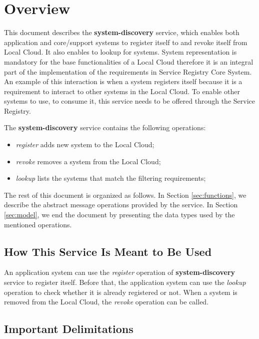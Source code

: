 \documentclass[a4paper]{arrowhead}
\begin{document}
\section{Overview}
\label{sec:overview}
This document describes the \textbf{system-discovery} service, which enables both application and core/support systems to register itself to and revoke itself from Local Cloud. It also enables to lookup for systems. System representation is mandatory for the base functionalities of a Local Cloud therefore it is an integral part of the implementation of the requirements in Service Registry Core System. An example of this interaction is when a system registers itself because it is a requirement to interact to other systems in the Local Cloud. To enable other systems to use, to consume it, this service needs to be offered through the Service Registry.

The \textbf{system-discovery} service contains the following operations:

\begin{itemize}
    \item \textit{register} adds new system to the Local Cloud;
    \item \textit{revoke} removes a system from the Local Cloud;
    \item \textit{lookup} lists the systems that match the filtering requirements;
\end{itemize}

The rest of this document is organized as follows.
In Section \ref{sec:functions}, we describe the abstract message operations provided by the service.
In Section \ref{sec:model}, we end the document by presenting the data types used by the mentioned operations.

\subsection{How This Service Is Meant to Be Used}
An application system can use the \textit{register} operation of \textbf{system-discovery} service to register itself. Before that, the application system can use the \textit{lookup} operation to check whether it is already registered or not. When a system is removed from the Local Cloud, the \textit{revoke} operation can be called.

\subsection{Important Delimitations}
\label{sec:delimitations}
\end{document}
